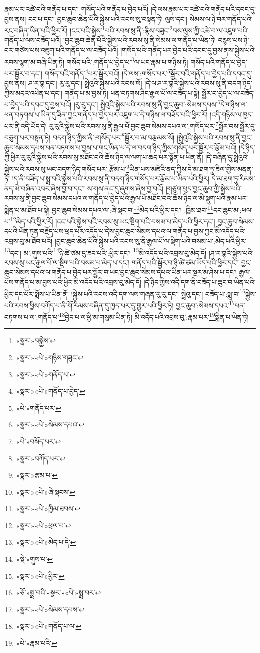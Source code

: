 རྣམ་པར་འཚེ་བའི་གནོད་པ་དང་། གསོད་པའི་གནོད་པ་བྱེད་པའོ། །དེ་ལས་རྣམ་པར་འཚེ་བའི་གནོད་པའི་དབང་དུ་བྱས་ནས། ངང་པ་དང་། བྱང་ཆུབ་ཆེན་པོའི་སྐྱེས་པའི་རབས་སུ་བསྟན་ཏེ། ལུས་དང་། སེམས་ལ་ཉེ་བར་གནོད་པའི་རང་བཞིན་ཡིན་པའི་ཕྱིར་རོ། །ངང་པའི་སྐྱེས་\footnote{«སྣར་»བསྐྱེས་}པའི་རབས་སུ་ནི་:རྙིས་བཟུང་\footnote{«སྣར་»«པེ་»གཉིས་གཟུང་}བས་ལུས་ཀྱི་འཚེ་བ་ལ་འཇུག་པའི་གནོད་པ་ལས་བཟོད་པའོ། །བྱང་ཆུབ་ཆེན་པོའི་སྐྱེས་པའི་རབས་སུ་ནི་སེམས་ལ་གནོད་པ་ཡིན་ཏེ། བརྙས་པས་ཉེ་བར་གཙེས་པས་འཇུག་པའི་གནོད་པ་ལ་བཟོད་པའོ། །གསོད་པའི་གནོད་པར་བྱེད་པའི་དབང་དུ་བྱས་ནས་སྐྱེས་པའི་རབས་ལྷག་མ་བཞི་ཡིན་ཏེ། གསོད་པའི་:གནོད་པ་བྱེད་པ་\footnote{«སྣར་»«པེ་»གནོད་པ་}ལ་ཡང་རྣམ་པ་གཉིས་ཏེ། གསོད་པའི་གནོད་པ་བྱེད་པར་སྦྱོར་བ་དང་། གསོད་པའི་གནོད་\footnote{«སྣར་»«པེ་»གནོད་པ་བྱེད་}པར་སྦྱོར་བའོ། །དེ་ལས་:གསོད་པར་\footnote{«པེ་»གནོད་པར་}སྦྱོར་བའི་གནོད་པ་བྱེད་པའི་དབང་དུ་བྱས་ནས། ཤ་ར་བྷ་དང་། རུ་རུ་དང་། སྤྲེའུའི་སྐྱེས་པའི་རབས་སོ། །དེ་ལ་ཤ་ར་བྷའི་སྐྱེས་པའི་རབས་སུ་ནི་བདག་ཉིད་ཀྱིས་མདའ་འཕེན་པ་དང་། གནོད་པ་མ་བྱས་ཏེ། ཕན་བཏགས་ཤིང་རྒྱལ་པོ་ལ་བཟོད་པ་སྟེ། སྦྱོར་བ་བྱེད་པ་ལ་བཟོད་པ་བྱེད་པའི་དབང་དུ་བྱས་པའོ། །རུ་རུ་དང་། སྤྲེའུའི་སྐྱེས་པའི་རབས་སུ་ནི་བྱང་ཆུབ་:སེམས་དཔས་\footnote{«སྣར་»«པེ་»སེམས་དཔའ་}དེ་གཉིས་ལ་ཕན་བཏགས་པ་ཡིན་དུ་ཟིན་ཀྱང་གནོད་པ་བྱེད་པར་འཇུག་པ་དེ་གཉིས་ལ་བཟོད་པའི་ཕྱིར་རོ། །འདི་གཉིས་ལ་ཁྱད་པར་ནི་འདི་ཡོད་དེ། རུ་རུའི་སྐྱེས་པའི་རབས་སུ་ནི་རྒྱལ་པོ་བྱང་ཆུབ་སེམས་དཔའ་ལ་:གསོད་པར་\footnote{«པེ་»བསོད་པར་}སྦྱོར་བས་སྦྱོར་དུ་བཅུག་པར་བསྟན་ཏེ། བདག་ཉིད་ཀྱིས་ནི་:གསོད་པར་\footnote{«སྣར་»བཀོད་པར་}སྦྱོར་བ་མ་བརྩམས་སོ། །སྤྲེའུའི་སྐྱེས་པའི་རབས་སུ་ནི་བྱང་ཆུབ་སེམས་དཔས་ཕན་བཏགས་པ་བྱས་པ་གང་ཡིན་པ་དེ་ལ་བདག་ཉིད་ཀྱིས་གསོད་པར་སྦྱོར་བ་རྩོམ་པའོ། །དེ་ཉིད་ཀྱི་ཕྱིར་རུ་རུའི་སྐྱེས་པའི་རབས་སུ་མཐོང་བའི་ཆོས་ཉིད་ལ་ལག་པ་ཆད་པར་སྟོན་པ་ཡིན་ནོ། །དེ་བཞིན་དུ་སྤྲེའུའི་སྐྱེས་པའི་རབས་སུ་ཡང་བདག་ཉིད་གསོད་པར་:རྩོམ་པ་\footnote{«སྣར་»རྩམ་པ་}ཡིན་པས་མཛེའི་ནད་ཀྱིས་དེ་མ་ཐག་ཏུ་ཟིལ་གྱིས་མནན་ཏོ། །ད་ནི་བཟོད་པ་སྨྲ་བའི་སྐྱེས་པའི་རབས་སུ་ནི་བདག་ཉིད་གསོད་པར་རྩོམ་པ་ཡིན་པའི་ཕྱིར། དེ་མ་ཐག་ཏུ་རིམས་ནད་མེ་བཞིན་འབར་ཞེས་བྱ་བ་དང་། ས་གས་ནང་དུ་ཞུགས་ཞེས་བྱ་བའོ། །གཙུག་ཕུད་བྱང་ཆུབ་ཀྱི་སྐྱེས་པའི་རབས་སུ་ནི་བྱང་ཆུབ་སེམས་དཔའ་ལ་གནོད་པ་བྱེད་པའི་རྒྱལ་པོ་མཐོང་བའི་ཆོས་ཉིད་ལ་མི་སྡུག་པའི་རྣམ་པར་སྨིན་པ་མ་ཐོབ་པ་སྟེ། བྱང་ཆུབ་སེམས་དཔའ་ལ་:ཞེ་སྡང་བ་\footnote{«སྣར་»«པེ་»ཞེ་སྡངས་}མེད་པའི་ཕྱིར་དང་། :ཁྱིམ་ཐབ་\footnote{«སྣར་»«པེ་»ཁྱིམ་ཐབས་}དང་ཆུང་མ་:ཕལ་པ་\footnote{«སྣར་»«པེ་»ཕྲལ་པ་}མེད་པའི་ཕྱིར་རོ། །ངང་པའི་སྐྱེས་པའི་རབས་སུ་ཡང་སྡིག་པའི་བསམ་པ་མེད་པའི་ཕྱིར་དང་། བྱང་ཆུབ་སེམས་དཔའི་ཡོན་ཏན་བརྗོད་པས་ཕྲད་པར་འདོད་པ་དེས་བྱང་ཆུབ་སེམས་དཔའ་ལ་གནོད་པ་བྱས་ཀྱང་མི་འདོད་པའི་འབྲས་བུ་མ་ཐོབ་པའོ། །བྱང་ཆུབ་ཆེན་པོའི་སྐྱེས་པའི་རབས་སུ་ནི་རྒྱལ་པོ་ལ་སྡིག་པའི་བསམ་པ་:མེད་པའི་ཕྱིར་\footnote{«སྣར་»«པེ་»མེད་པ་དེ་}དང་། མ་:གུས་པའི་\footnote{«སྡེ་»གུས་པ་}ཉི་ཚེ་ཙམ་དུ་ཟད་པའི་:ཕྱིར་དང་། \footnote{«སྣར་»«པེ་»ཕྱིར་}མི་འདོད་པའི་འབྲས་བུ་མེད་དོ། །ཤ་ར་བྷའི་སྐྱེས་པའི་རབས་སུ་ཡང་རྒྱལ་པོ་ལ་སྡིག་པའི་བསམ་པ་མེད་པ་དང་། གནོད་པའི་སྦྱོར་བ་ཉི་ཚེ་ཙམ་ཡོད་པའི་ཕྱིར་དང་། བྱང་ཆུབ་སེམས་དཔའ་ལ་གནོད་པ་བྱེད་པར་སྦྱོར་བ་ཡང་བྱང་ཆུབ་སེམས་དཔའ་ཡིན་པར་སྔར་མ་ཤེས་པ་དང་། རྒྱལ་པོས་གནོད་པ་མ་བྱས་པའི་ཕྱིར་མི་འདོད་པའི་འབྲས་བུ་མེད་དོ། །དེ་ཉིད་ཀྱིས་འདི་དག་ནི་བཟོད་པ་ཆུང་བ་ཡིན་པའི་ཕྱིར་དང་པོར་སྨོས་པ་ཡིན་ནོ། །སྐྱེས་པའི་རབས་འདི་དག་ལས་གཞན་རུ་རུ་དང་། སྤྲེའུ་དང་། བཟོད་པ་:སྨྲ་བ་\footnote{«ཅོ་»སྨྲ་བའི་«སྣར་»«པེ་»སྨྲ་བར་}སྐྱེས་པའི་རབས་ཕྱིས་བཀོད་པ་ནི་གོ་རིམས་བཞིན་དུ་ཁྱད་པར་དུ་གྱུར་པའི་ཕྱིར་ཏེ། བྱང་ཆུབ་:སེམས་དཔའ་\footnote{«སྣར་»«པེ་»སེམས་དཔས་}ཕན་བཏགས་པ་ལ་:གནོད་པ་\footnote{«སྣར་»«པེ་»གནོད་པ་ལ་}བྱེད་པ་ལ་ཕྱི་མ་གསུམ་ཡིན་ཏེ། མི་འདོད་པའི་འབྲས་བུ་:རྣམ་པར་\footnote{«པེ་»རྣམ་པའི་}སྨིན་པ་ཡིན་ཏེ། 